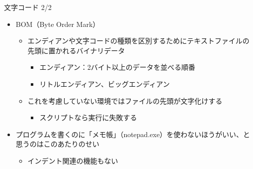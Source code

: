 \documentclass[12pt,aspectratio=169]{beamer}
\begin{document}
\begin{frame}{文字コード 2/2}
  \begin{itemize}
    \item BOM（Byte Order Mark）
      \begin{itemize}
        \item エンディアンや文字コードの種類を区別するためにテキストファイルの先頭に置かれるバイナリデータ
          \begin{itemize}
            \item エンディアン：2バイト以上のデータを並べる順番
            \item リトルエンディアン、ビッグエンディアン
          \end{itemize}
        \item これを考慮していない環境ではファイルの先頭が文字化けする
          \begin{itemize}
            \item スクリプトなら実行に失敗する
          \end{itemize}
      \end{itemize}

    \item プログラムを書くのに「メモ帳」（notepad.exe）を使わないほうがいい、と思うのはこのあたりのせい
      \begin{itemize}
        \item インデント関連の機能もない
      \end{itemize}

  \end{itemize}

\end{frame}
\end{document}
